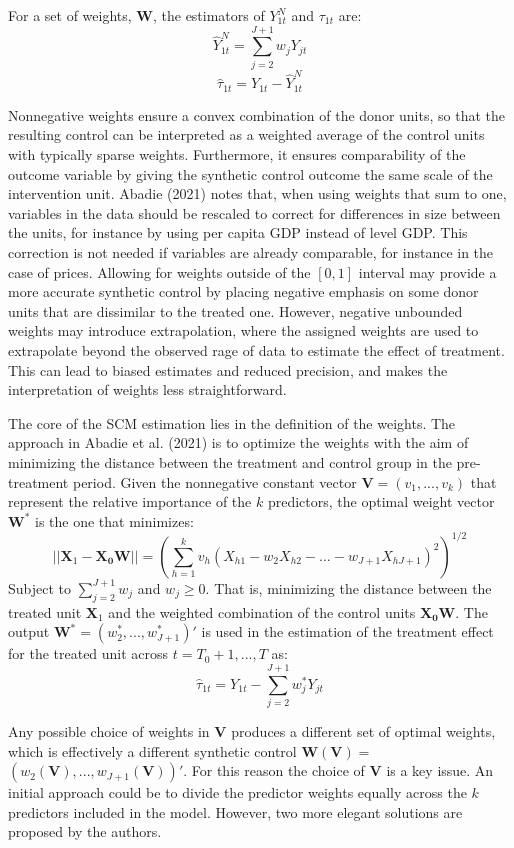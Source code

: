\documentclass[12pt,a4paper,draft]{article}
\begin{document}
For a set of weights, $\mathbf{W}$, the estimators of $Y_{1t}^N$ and $\tau_{1t}$ are:
$$ \hat{Y}_{1t}^N = \sum_{j=2}^{J+1} {w_jY_{jt}} $$
$$ \hat{\tau}_{1t}=Y_{1t}- \hat{Y}_{1t}^N$$

Nonnegative weights ensure a convex combination of the donor 
units, so that the resulting control can be interpreted as a weighted average 
of the control units with typically sparse weights. 
Furthermore, it ensures comparability of the outcome variable by giving the 
synthetic control outcome the same scale of the intervention unit. 
Abadie (2021) notes that, when using weights that sum to one, variables in the data 
should be rescaled to correct for differences in size between the units, for 
instance by using per capita GDP instead of level GDP. This correction is not 
needed if variables are already comparable, for instance in the case of prices.
Allowing for weights outside of the $[0,1]$ interval may provide a more 
accurate synthetic control by placing negative emphasis on some donor units that 
are dissimilar to the treated one. However, negative unbounded weights may 
introduce extrapolation, where the assigned weights are used to extrapolate 
beyond the observed rage of data to estimate the effect of treatment. 
This can lead to biased estimates and reduced precision, and makes the interpretation 
of weights less straightforward. 

The core of the SCM estimation lies in the definition of the weights. 
The approach in Abadie et al. (2021) is to optimize the weights with the aim of 
minimizing the distance between the treatment and control group in the 
pre-treatment period. Given the nonnegative constant vector $\mathbf{V}=(v_1,...,v_k)$ 
that represent the relative importance of the $k$ predictors, the optimal 
weight vector $\mathbf{W}^*$ is the one that minimizes:
$$ || \mathbf{X}_1 - \mathbf{X_0} \mathbf{W} || = 
\left( \sum_{h=1}^k {v_h \left( X_{h1}-w_2 X_{h2}-\ldots - w_{J+1} 
X_{hJ+1} \right) ^2} \right)^{1/2} $$
Subject to $\sum_{j=2}^{J+1}w_j$ and $w_j \geq 0$. That is, minimizing the distance 
between the treated unit $\mathbf{X}_1$ and the weighted combination of the 
control units $\mathbf{X_0} \mathbf{W}$. The output $\mathbf{W}^*=
\left( w_2^*,...,w_{J+1}^*\right) '$ is used in the estimation of the treatment 
effect for the treated unit across $t=T_0+1,...,T$ as:
$$ \hat{\tau}_{1t} = Y_{1t} - \sum_{j=2}^{J+1}{w^*_j Y_{jt}}$$

Any possible choice of weights in $\mathbf{V}$ produces a different set of optimal 
weights, which is effectively a different synthetic control 
$\mathbf{W}(\mathbf{V})=$ \newline $\left(w_2(\mathbf{V}),...,w_{J+1}(\mathbf{V})\right)'$.
For this reason the choice of $\mathbf{V}$ is a key issue. An initial approach could 
be to divide the predictor weights equally across the $k$ predictors included in the 
model. However, two more elegant solutions are proposed by the authors.
\end{document}
